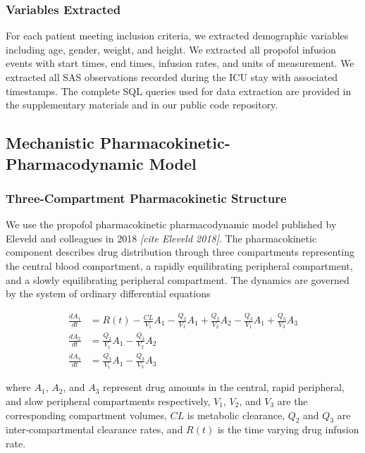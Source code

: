 \documentclass[11pt,a4paper]{article}
\newcommand{\placeholder}[1]{\textcolor{placeholdergray}{\textit{[#1]}}}
\begin{document}
\subsubsection{Variables Extracted}

For each patient meeting inclusion criteria, we extracted demographic
variables including age, gender, weight, and height. We extracted all
propofol infusion events with start times, end times, infusion rates,
and units of measurement. We extracted all SAS observations recorded
during the ICU stay with associated timestamps. The complete SQL queries
used for data extraction are provided in the supplementary materials
and in our public code repository.

\subsection{Mechanistic Pharmacokinetic-Pharmacodynamic Model}

\subsubsection{Three-Compartment Pharmacokinetic Structure}

We use the propofol pharmacokinetic pharmacodynamic model published by
Eleveld and colleagues in 2018 \placeholder{cite Eleveld 2018}. The
pharmacokinetic component describes drug distribution through three
compartments representing the central blood compartment, a rapidly
equilibrating peripheral compartment, and a slowly equilibrating
peripheral compartment. The dynamics are governed by the system of
ordinary differential equations

\begin{align}
\frac{dA_1}{dt} &= R(t) - \frac{CL}{V_1}A_1 - \frac{Q_2}{V_1}A_1
                + \frac{Q_2}{V_2}A_2 - \frac{Q_3}{V_1}A_1 + \frac{Q_3}{V_3}A_3 \\
\frac{dA_2}{dt} &= \frac{Q_2}{V_1}A_1 - \frac{Q_2}{V_2}A_2 \\
\frac{dA_3}{dt} &= \frac{Q_3}{V_1}A_1 - \frac{Q_3}{V_3}A_3
\end{align}

where $A_1$, $A_2$, and $A_3$ represent drug amounts in the central,
rapid peripheral, and slow peripheral compartments respectively, $V_1$,
$V_2$, and $V_3$ are the corresponding compartment volumes, $CL$ is
metabolic clearance, $Q_2$ and $Q_3$ are inter-compartmental clearance
rates, and $R(t)$ is the time varying drug infusion rate.
\end{document}
